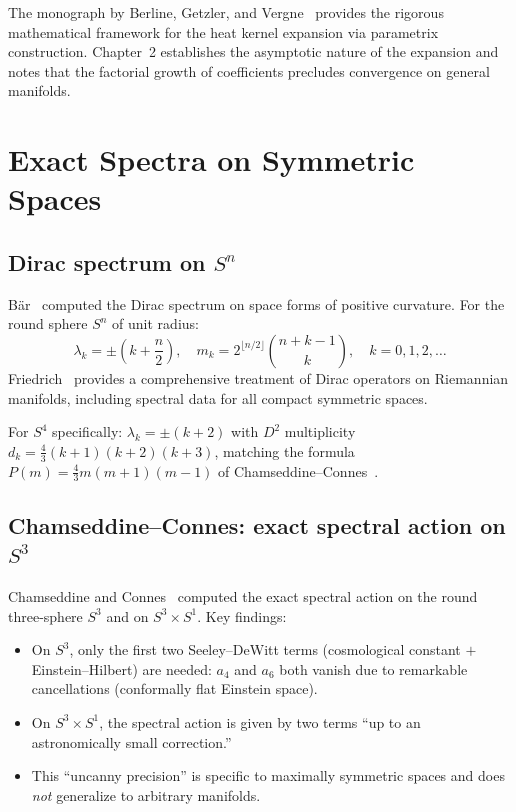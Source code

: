 \documentclass[11pt,a4paper]{article}
\begin{document}
The monograph by Berline, Getzler, and Vergne~\cite{BGV04} provides
the rigorous mathematical framework for the heat kernel expansion via
parametrix construction.  Chapter~2 establishes the asymptotic nature
of the expansion and notes that the factorial growth of coefficients
precludes convergence on general manifolds.


\section{Exact Spectra on Symmetric Spaces}\label{sec:exact-spectra}

\subsection{Dirac spectrum on \texorpdfstring{$S^n$}{Sn}}

B\"{a}r~\cite{B96} computed the Dirac spectrum on space forms of
positive curvature.  For the round sphere $S^n$ of unit radius:
\begin{equation}
  \lambda_k = \pm\!\left(k + \frac{n}{2}\right), \quad
  m_k = 2^{\lfloor n/2\rfloor}\binom{n+k-1}{k}, \quad
  k = 0,1,2,\ldots
\end{equation}
Friedrich~\cite{F00} provides a comprehensive treatment of Dirac operators
on Riemannian manifolds, including spectral data for all compact symmetric
spaces.

For $S^4$ specifically: $\lambda_k = \pm(k+2)$ with $D^2$ multiplicity
$d_k = \frac{4}{3}(k+1)(k+2)(k+3)$, matching the formula
$P(m) = \frac{4}{3}m(m+1)(m-1)$ of Chamseddine--Connes~\cite{CC08}.

\subsection{Chamseddine--Connes: exact spectral action on \texorpdfstring{$S^3$}{S3}}

Chamseddine and Connes~\cite{CC08} computed the exact spectral action on
the round three-sphere $S^3$ and on $S^3 \times S^1$.  Key findings:

\begin{itemize}
  \item On $S^3$, only the first two Seeley--DeWitt terms (cosmological
    constant $+$ Einstein--Hilbert) are needed: $a_4$ and $a_6$ both vanish
    due to remarkable cancellations (conformally flat Einstein space).
  \item On $S^3 \times S^1$, the spectral action is given by two terms
    ``up to an astronomically small correction.''
  \item This ``uncanny precision'' is specific to maximally symmetric
    spaces and does \emph{not} generalize to arbitrary manifolds.
\end{itemize}
\end{document}
